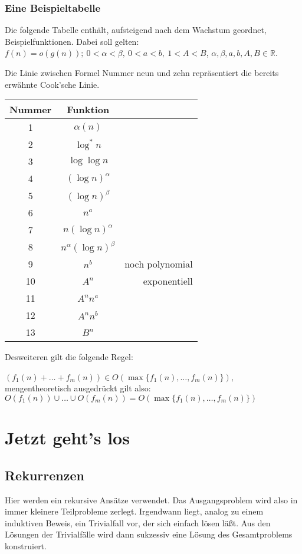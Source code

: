 \documentclass[ngerman,draft,parskip=half*,twoside]{scrreprt}
\theoremstyle{break}
\begin{document}
\subsection{Eine Beispieltabelle}
Die folgende Tabelle enthält, aufsteigend nach dem Wachstum geordnet, Beispielfunktionen.
Dabei soll gelten: $f(n)=o(g(n));\ 0 < \alpha < \beta,\ 0<a<b,\ 1<A<B$,
$\alpha,\beta,a, b, A, B \in \mathbb{R}$.

Die Linie zwischen Formel Nummer neun und zehn repräsentiert die bereits erwähnte Cook'sche Linie.
\bigskip

\begin{table}[h]
\begin{tabular}{c|cr}
    Nummer      &Funktion       \\ \hline
    1   &       $\alpha (n)$    \\
    2   &       $\log^{*}n$     \\
    3   &       $\log \log n $  \\
    4   &       ${(\log n)}^{\alpha}$ \\
    5   &       ${(\log n)}^{\beta}$  \\
    6   &       $n^a$           \\
    7   &       $n (\log n)^{\alpha}$      \\
    8   &       $n^{\alpha}{(\log n)}^{\beta}$  \\
    9   &       $n^b$           & noch polynomial\\ \hline
    10  &       $A^n$           & exponentiell\\
    11  &       $A^n n^a$       \\
    12  &       $A^n n^b$       \\
    13  &       $B^n$           
\end{tabular}
\end{table}

Desweiteren gilt die folgende Regel:

\noindent
$(f_1(n)+ \dots +f_m(n)) \in O (\max\{f_1(n),\dots,f_m(n)\})$, mengentheoretisch ausgedrückt gilt also: $O(f_1(n)) \cup \dots
\cup O(f_m(n)) = O (\max\{f_1(n),\dots,f_m(n)\})$


\chapter{Jetzt geht's los}

\section{Rekurrenzen}
Hier werden ein rekursive Ansätze verwendet. Das Ausgangsproblem wird also in immer kleinere Teilprobleme zerlegt.
Irgendwann liegt, analog zu einem induktiven Beweis, ein Trivialfall vor, der sich einfach lösen läßt. Aus den Lösungen der Trivialfälle
wird dann sukzessiv eine Lösung des Gesamtproblems konstruiert.
\end{document}
